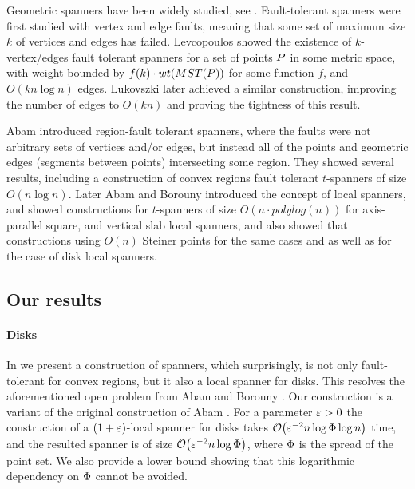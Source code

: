 \documentclass[12pt]{article}%
\begin{document}
Geometric spanners have been widely studied, see \cite{ns-gsn-07}. Fault-tolerant spanners were first studied with vertex and edge faults, meaning that some set of maximum size $k$ of vertices and edges has failed. Levcopoulos \etal \cite{lns-iacfts-02} showed the existence of $k$-vertex/edges fault tolerant spanners for a set of points $P$ in some metric space, with weight bounded by $f(k)\cdot wt(MST(P))$ for some function $f$, and $O(kn\log n)$ edges. Lukovszki \cite{l-nrftgs-99} later achieved a similar construction, improving the number of edges to $O(kn)$ and proving the tightness of this result.

Abam \etal\cite{abfg-rftgs-09} introduced region-fault tolerant spanners, where the faults were not arbitrary sets of vertices and/or edges, but instead all of the points and geometric edges (segments between points) intersecting some region. They showed several results, including a construction of convex regions fault tolerant $t$-spanners of size $O(n\log n)$. Later Abam and Borouny \cite{ab-lgs-21} introduced the concept of local spanners, and showed constructions for $t$-spanners of size $O(n\cdot polylog(n))$ for axis-parallel square, and vertical slab local spanners, and also showed that constructions using $O(n)$ Steiner points for the same cases and as well as for the case of disk local spanners.

\subsection*{Our results}

\paragraph{Disks}

In  we present a construction of spanners, which surprisingly, is not
only fault-tolerant for convex regions, but it also a local spanner
for disks. This resolves the aforementioned open problem from Abam and
Borouny \cite{ab-lgs-21}. Our construction is a variant of the
original construction of Abam \etal \cite{abfg-rftgs-09}. For a parameter $\varepsilon>0$ the construction of a $(1+\varepsilon)$-local spanner for disks takes $\Of\pth{ \eps^{-2} n\log \spread \log n }$ time, and the resulted spanner is of size $\Of\pth{ \eps^{-2} n\log \spread }$, where $\Phi$ is the spread of the point set. We also provide a lower bound showing that this logarithmic dependency on $\Phi$ cannot be avoided.
 
\end{document}
